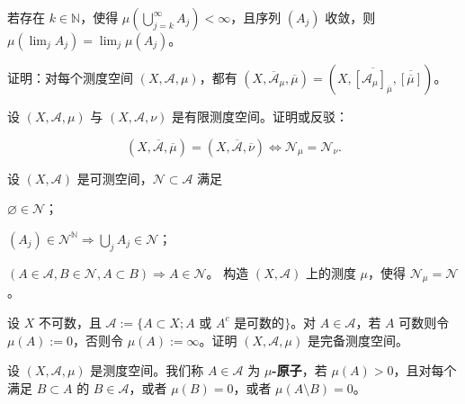 \begin{exercises}
\begin{items}
若存在 $ k \in \mathbb{N} $，使得 $ \mu\left(\bigcup_{j=k}^{\infty} A_{j}\right) < \infty $，且序列 $ (A_{j}) $ 收敛，则 $ \mu(\lim_{j} A_{j}) = \lim_{j} \mu(A_{j}) $。

\end{items}

\item

证明：对每个测度空间 $ (X, \mathcal{A}, \mu) $，都有 $ (X, \overline{\mathcal{A}}_{\mu}, \overline{\mu}) = (X, \overline{[\mathcal{A}_{\mu}]_{\overline{\mu}}}, \overline{[\overline{\mu}]}) $。

\item

设 $ (X, \mathcal{A}, \mu) $ 与 $ (X, \mathcal{A}, \nu) $ 是有限测度空间。证明或反驳：

\[
(X, \overline{\mathcal{A}}, \overline{\mu}) = (X, \overline{\mathcal{A}}, \overline{\nu}) \iff \mathcal{N}_{\mu} = \mathcal{N}_{\nu} .
\]
\item

设 $ (X, \mathcal{A}) $ 是可测空间，$ \mathcal{N} \subset \mathcal{A} $ 满足

\begin{subitems}
\item

$ \varnothing \in \mathcal{N} $；

\item

$ (A_{j}) \in \mathcal{N}^{\mathbb{N}} \Rightarrow \bigcup_{j} A_{j} \in \mathcal{N} $；

\item

$ (A \in \mathcal{A}, B \in \mathcal{N}, A \subset B) \Rightarrow A \in \mathcal{N} $。
构造 $ (X, \mathcal{A}) $ 上的测度 $ \mu $，使得 $ \mathcal{N}_{\mu} = \mathcal{N} $。

\end{subitems}

\item

设 $ X $ 不可数，且 $ \mathcal{A} := \{ A \subset X ; A \text{ 或 } A^{c} \text{ 是可数的} \} $。对 $ A \in \mathcal{A} $，若 $ A $ 可数则令 $ \mu(A) := 0 $，否则令 $ \mu(A) := \infty $。证明 $ (X, \mathcal{A}, \mu) $ 是完备测度空间。

\item

设 $ (X, \mathcal{A}, \mu) $ 是测度空间。我们称 $ A \in \mathcal{A} $ 为 \textbf{$ \mu $-原子}，若 $ \mu(A) > 0 $，且对每个满足 $ B \subset A $ 的 $ B \in \mathcal{A} $，或者 $ \mu(B) = 0 $，或者 $ \mu(A \setminus B) = 0 $。


\end{exercises}
